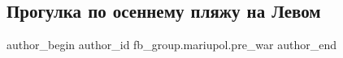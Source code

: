  
 
 
 
 

\subsection{Прогулка по осеннему пляжу на Левом}
\label{sec:04_01_2023.fb.fb_group.mariupol.pre_war.1.progulka_po_osennemu}

\ifcmt
 author_begin
   author_id fb_group.mariupol.pre_war
 author_end
\fi
